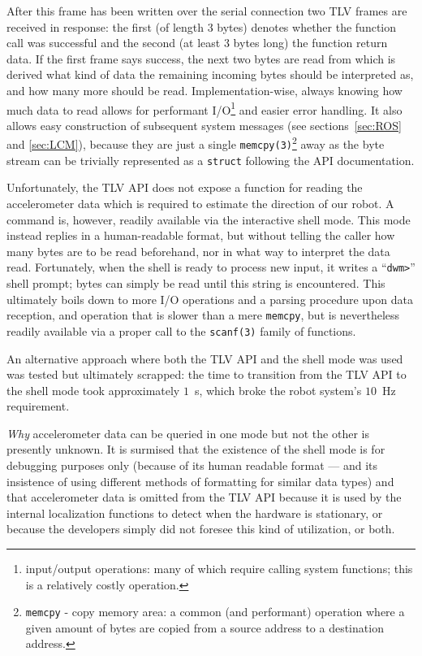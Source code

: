 After this frame has been written over the serial connection two TLV frames are received in response:
the first (of length 3 bytes) denotes whether the function call was successful and the second (at least 3 bytes long) the function return data.
If the first frame says success, the next two bytes are read from which is derived what kind of data the remaining incoming bytes should be interpreted as,
and how many more should be read.
Implementation-wise, always knowing how much data to read allows for performant I/O\footnote{input/output operations: many of which require calling system functions; this is a relatively costly operation.} and easier error handling.
It also allows easy construction of subsequent system messages (see sections~\ref{sec:ROS} and \ref{sec:LCM}), because they are just a single \texttt{memcpy(3)}\footnote{\texttt{memcpy} - copy memory area: a common (and performant) operation where a given amount of bytes are copied from a source address to a destination address.} away as the byte stream can be trivially represented as a \texttt{struct} following the API documentation.

Unfortunately, the TLV API does not expose a function for reading the accelerometer data which is required to estimate the direction of our robot.
A command is, however, readily available via the interactive shell mode.
This mode instead replies in a human-readable format, but without telling the caller how many bytes are to be read beforehand, nor in what way to interpret the data read.
Fortunately, when the shell is ready to process new input, it writes a ``\texttt{dwm>}'' shell prompt;
bytes can simply be read until this string is encountered.
This ultimately boils down to more I/O operations and a parsing procedure upon data reception, and operation that is slower than a mere \texttt{memcpy},
but is nevertheless readily available via a proper call to the \texttt{scanf(3)} family of functions.

An alternative approach where both the TLV API and the shell mode was used was tested but ultimately scrapped:
the time to transition from the TLV API to the shell mode took approximately $1$~s, which broke the robot system's $10$~Hz requirement.

\textit{Why} accelerometer data can be queried in one mode but not the other is presently unknown.
It is surmised that the existence of the shell mode is for debugging purposes only (because of its human readable format --- and its insistence of using different methods of formatting for similar data types) and that accelerometer data is omitted from the TLV API because it is used by the internal localization functions to detect when the hardware is stationary,
or because the developers simply did not foresee this kind of utilization,
or both.

